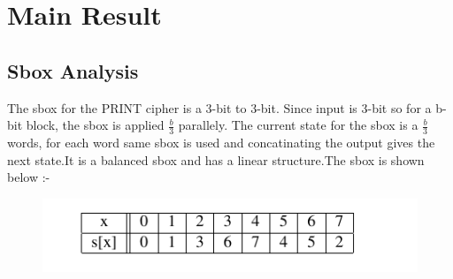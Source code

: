 \documentclass[journal=tosc,preprint]{iacrtrans}
\begin{document}
\section{Main Result}
\label{sec:main}

\subsection{Sbox Analysis}

The sbox for the PRINT cipher is a 3-bit to 3-bit. Since input is 3-bit so for a b-bit block, the sbox is applied $\frac{b}{3}$ parallely. The current state for the sbox is a $\frac{b}{3}$ words, for each word same sbox is used and concatinating the output gives the next state.It is a balanced sbox and has a linear structure.The sbox is shown below :- 

\begin{figure}[ht]
	\centering
	\includegraphics{pics/sbox1.png}
\end{figure}
\end{document}
